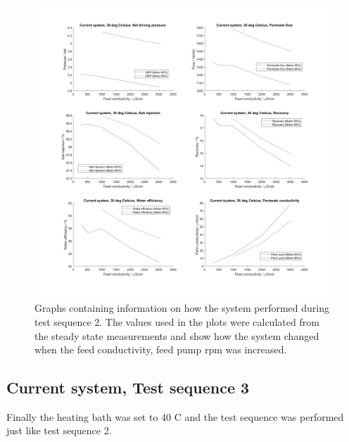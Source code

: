 \begin{figure}[H]
    \centering
    \includegraphics[width=1.1\textwidth]{Key30}
    \caption{Graphs containing information on how the system performed during test sequence 2. The values used in the plots were calculated from the steady state measurements and show how the system changed when the feed conductivity, feed pump rpm was increased.}
    \label{fig:K30}
\end{figure}

\newpage

\subsection{Current system, Test sequence 3}

Finally the heating bath was set to 40 C and the test sequence was performed just like test sequence 2. 

